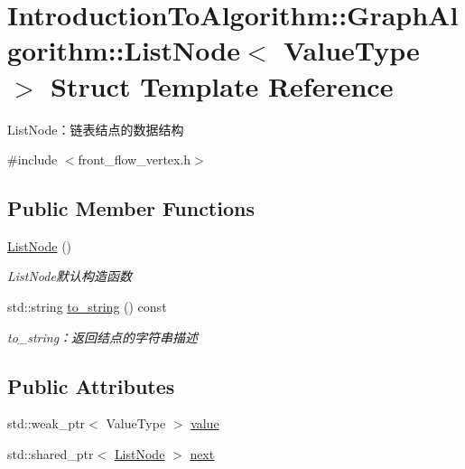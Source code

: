\hypertarget{struct_introduction_to_algorithm_1_1_graph_algorithm_1_1_list_node}{}\section{Introduction\+To\+Algorithm\+:\+:Graph\+Algorithm\+:\+:List\+Node$<$ Value\+Type $>$ Struct Template Reference}
\label{struct_introduction_to_algorithm_1_1_graph_algorithm_1_1_list_node}


List\+Node：链表结点的数据结构  




{\ttfamily \#include $<$front\+\_\+flow\+\_\+vertex.\+h$>$}

\subsection*{Public Member Functions}
\begin{DoxyCompactItemize}
\item 
\hyperlink{struct_introduction_to_algorithm_1_1_graph_algorithm_1_1_list_node_a28a10edc3e4414f2b3f41945bb886be4}{List\+Node} ()
\begin{DoxyCompactList}\small\item\em List\+Node默认构造函数 \end{DoxyCompactList}\item 
std\+::string \hyperlink{struct_introduction_to_algorithm_1_1_graph_algorithm_1_1_list_node_a09b7805e42547e2cf808e6be7b202be5}{to\+\_\+string} () const 
\begin{DoxyCompactList}\small\item\em to\+\_\+string：返回结点的字符串描述 \end{DoxyCompactList}\end{DoxyCompactItemize}
\subsection*{Public Attributes}
\begin{DoxyCompactItemize}
\item 
std\+::weak\+\_\+ptr$<$ Value\+Type $>$ \hyperlink{struct_introduction_to_algorithm_1_1_graph_algorithm_1_1_list_node_a77c644bba4a2996906d1d5b5be300b00}{value}
\item 
std\+::shared\+\_\+ptr$<$ \hyperlink{struct_introduction_to_algorithm_1_1_graph_algorithm_1_1_list_node}{List\+Node} $>$ \hyperlink{struct_introduction_to_algorithm_1_1_graph_algorithm_1_1_list_node_a78e88960b96014607258bf721c2023d1}{next}
\end{DoxyCompactItemize}


